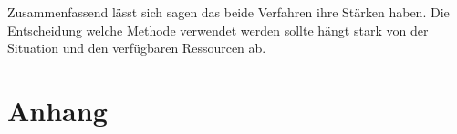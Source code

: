 \documentclass[conference]{IEEEtran}
\begin{document}
	Zusammenfassend lässt sich sagen das beide Verfahren ihre Stärken haben. Die Entscheidung welche Methode verwendet werden sollte hängt stark von der Situation und den verfügbaren Ressourcen ab.
	
	\printbibliography
%		
	
	\section{Anhang}
	
	
\end{document}
